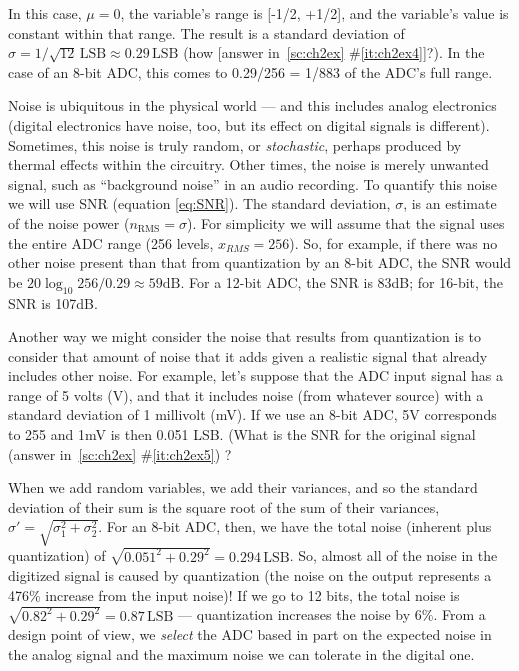 In this case, $\mu=0$, the variable's range is [-1/2, +1/2], and the
variable's value is constant within that range. The result is a
standard deviation of $\sigma = 1/\sqrt{12} \, \mathrm{LSB} \approx
0.29 \, \mathrm{LSB}$ (how [answer in~\ref{sc:ch2ex}
\#\ref{it:ch2ex4}]?). In the case of an 8-bit ADC, this comes to
0.29/256 = 1/883 of the ADC's full range.

Noise is ubiquitous in the physical world --- and this includes
analog electronics (digital electronics have noise, too, but its
effect on digital signals is different). Sometimes, this noise is
truly random, or \emph{stochastic}, perhaps produced by thermal
effects within the circuitry. Other times, the noise is merely
unwanted signal, such as ``background noise'' in an audio recording.
To quantify this noise we will use SNR (equation \ref{eq:SNR}). The standard deviation, $\sigma$, is an estimate of the noise power ($n_\mathrm{RMS}=\sigma$). For simplicity we will assume that the signal uses the entire ADC range (256 levels, $x_{RMS}=256$).
So, for example, if there was no other noise
present than that from quantization by an 8-bit ADC, the SNR would be
$20 \log_{10} 256/0.29 \approx 59\mathrm{dB}$. For a 12-bit ADC, the SNR is
83dB; for 16-bit, the SNR is 107dB.

Another way we might consider the noise that results from quantization
is to consider that amount of noise that it adds given a realistic
signal that already includes other noise. For example, let's suppose
that the ADC input signal has a range of 5 volts (V), and that it
includes noise (from whatever source) with a standard deviation of 1
millivolt (mV). If we use an 8-bit ADC, 5V corresponds to 255 and 1mV
is then 0.051 LSB. (What is the SNR for the original signal (answer
in~\ref{sc:ch2ex} \#\ref{it:ch2ex5}) ?

When we add
random variables, we add their variances, and so the standard
deviation of their sum is the square root of the sum of their
variances, $\sigma' = \sqrt{\sigma_1^2 + \sigma_2^2}$. For an 8-bit
ADC, then, we have the total noise (inherent plus quantization) of
$\sqrt{0.051^2 + 0.29^2} = 0.294 \, \textrm{LSB}$. So, almost all of
the noise in the digitized signal is caused by quantization (the noise
on the output represents a 476\% increase from the input noise)! If we
go to 12 bits, the total noise is $\sqrt{0.82^2 + 0.29^2} = 0.87 \,
\textrm{LSB}$ --- quantization increases the noise by 6\%. From a
design point of view, we \emph{select} the ADC based in part on the
expected noise in the analog signal and the maximum noise we can
tolerate in the digital one.  

